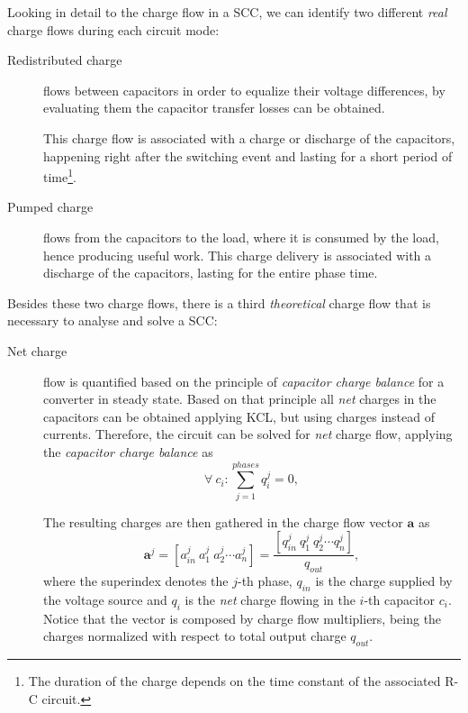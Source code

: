 Looking in detail to the charge flow in a SCC, we can identify two different \emph{real} charge flows during each circuit mode:
\begin{description}

  \item[Redistributed charge] flows between capacitors in order to equalize their voltage differences, by evaluating them the capacitor transfer losses can be obtained.

      This charge flow is associated with a charge or discharge of the capacitors, happening right after the switching event and lasting for a short period of time\footnote{The duration of the charge depends on the time constant of the associated R-C circuit.}.

  \item[Pumped charge] flows from the capacitors to the load, where it is consumed by the load, hence producing useful work.  This charge delivery is associated with a discharge of the capacitors, lasting for the entire phase time.

\end{description}

Besides these two charge flows, there is a third \emph{theoretical} charge flow that is necessary to analyse and solve a SCC:
\begin{description}

  \item[Net charge] flow is quantified based on the principle of \emph{capacitor charge balance} for a converter in steady state. Based on that principle all \emph{net} charges in the capacitors can be obtained applying KCL, but using charges instead of currents. Therefore, the circuit can be solved for \emph{net} charge flow, applying the \emph{capacitor charge balance} as
      \begin{equation}
       \forall~c_{i} : \sum_{j=1}^{phases}q_{i}^j = 0,
      \label{eq:charge_balance}
      \end{equation}

     The resulting charges are then gathered in the charge flow vector $\mathbf{a}$ as
       \begin{equation}
        \mathbf{a}^j =  \left[ a_{in}^j~a_1^j~a_2^j \cdots a_n^j \right] = \frac{\left[ q_{in}^j~q_1^j~q_2^j \cdots q_n^j \right]}{q_{out}},
      \label{eq:a_vector}
      \end{equation}
    where the superindex denotes the $j$-th phase, $q_{in}$ is the charge supplied by the voltage source and $q_i$ is the \emph{net} charge flowing in the $i$-th capacitor $c_i$. Notice that the vector is composed by charge flow multipliers, being the charges  normalized with respect to total output charge $q_{out}$.
\end{description}


